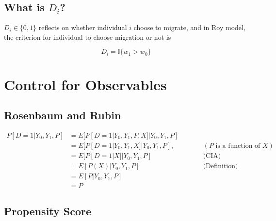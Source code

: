\documentclass[11pt]{article}
\begin{document}
    \subsection{What is $D_i$?}
    
        $D_i \in \{0,1\}$ reflects on whether individual $i$ choose to migrate, and in Roy model, the criterion for individual to choose migration or not is

        \[
            D_i = \mathbb{I}\{w_1 > w_0\}
        \]


    
    
    
\section{Control for Observables}

    \subsection{Rosenbaum and Rubin}

        \[ \begin{aligned}
            P[D = 1|Y_0, Y_1, P] &= E[P[D = 1|Y_0, Y_1, P, X]|Y_0, Y_1, P]  &\qquad &\\
            &= E[P[D = 1|Y_0, Y_1, X]|Y_0, Y_1, P], && (P \text{ is a function of } X) \\
            &= E[P[D = 1|X]|Y_0, Y_1, P] && \text{(CIA)} \\
            &= E[P(X)|Y_0, Y_1, P] && \text{(Definition)}\\
            &= E[P|Y_0, Y_1, P] \\
            &= P
        \end{aligned} \]


    \subsection{Propensity Score}
\end{document}

